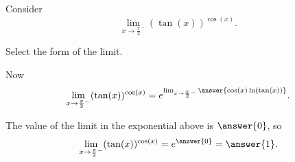 \documentclass{ximera}
\author{Nela Lakos \and Kyle Parsons}
\begin{document}
\begin{exercise}

Consider
\[
\lim_{x\to\frac{\pi}{2}^-} (\tan(x))^{\cos(x)}.
\]

Select the form of the limit.
\begin{multipleChoice}
\end{multipleChoice}

Now
\[
\lim_{x\to\frac{\pi}{2}^-} (\tan(x))^{\cos(x)} = e^{\lim_{x\to\frac{\pi}{2}^-}\answer{\cos(x) \ln(\tan(x))}}.
\]

The value of the limit in the exponential above is $\answer{0}$, so
\[
\lim_{x\to\frac{\pi}{2}^-} (\tan(x))^{\cos(x)} = e^{\answer{0}} = \answer{1}.
\]

\end{exercise}
\end{document}
